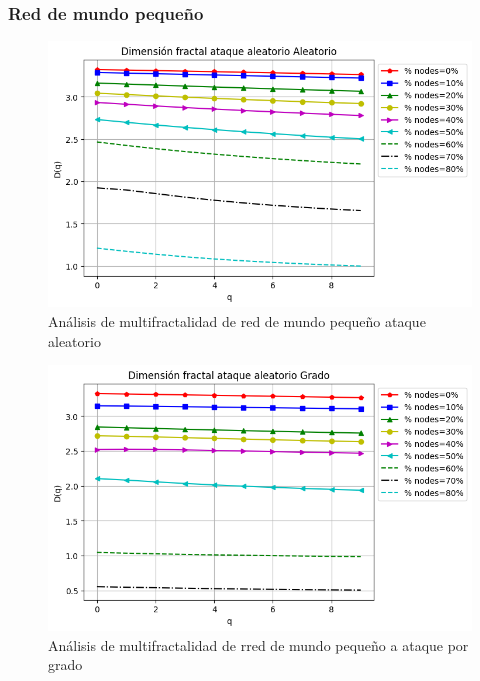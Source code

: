 \subsubsection{Red de mundo pequeño}
\begin{figure}[H]
    \centering
    \includegraphics[scale=0.7]{Capitulo6MultifractalidadYRobustez/imagenes/grafica_DqRandom20180510_143549SmallWorld5000NodesRewire01.png}
    \caption{Análisis de multifractalidad de red de mundo pequeño ataque aleatorio }
\end{figure}

\begin{figure}[H]
    \centering
    \includegraphics[scale=0.7]{Capitulo6MultifractalidadYRobustez/imagenes/grafica_DqDegree20180510_143549SmallWorld5000NodesRewire01.png}
    \caption{Análisis de multifractalidad de rred de mundo pequeño a ataque por grado }
\end{figure}

